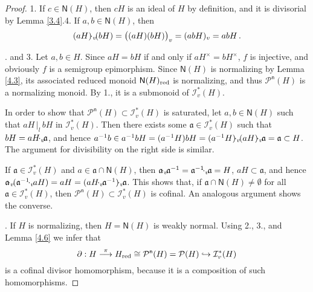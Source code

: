 \documentclass[a4paper]{amsart}
\theoremstyle{definition}
\numberwithin{equation}{section}
\begin{document}
\begin{proof}
1. If $c \in \mathsf N (H)$, then $cH$ is an ideal of $H$ by
definition, and it is divisorial by Lemma \ref{3.4}.4. If $a, b \in
\mathsf N (H)$, then
\[
(aH) {\negthinspace \cdot_v \negthinspace} (bH) = \big( (aH)(bH) \big)_v = (abH)_v = abH \,.
\]

. and 3. Let $a, b \in H$. Since $aH = bH$ if and only if
$aH^{\times} = bH^{\times}$, $f$ is injective, and obviously $f$ is
a semigroup epimorphism. Since $\mathsf N (H)$ is normalizing by
Lemma \ref{4.3}, its associated reduced monoid $\mathsf N
(H)_{{\text{\rm red}}}$ is normalizing, and thus $\mathcal P^{\mathsf n} (H)$ is
a normalizing monoid. By 1., it is a submonoid of $\mathcal I_v^*
(H)$.

In order to show that $\mathcal P^{\mathsf n} (H) \subset \mathcal
I_v^* (H)$ is saturated, let $a, b \in \mathsf N (H)$ such that $aH
{\, |_l \,} bH$ in $\mathcal I_v^* (H)$. Then there exists some $\mathfrak a
\in \mathcal I_v^* (H)$ such that $bH = aH {\negthinspace \cdot_v \negthinspace} \mathfrak a$, and hence $a^{-1}b \in a^{-1}bH = (a^{-1}H)bH = (a^{-1}H) {\negthinspace \cdot_v \negthinspace} (aH) {\negthinspace \cdot_v \negthinspace} \mathfrak a = \mathfrak a \subset H$. The argument for divisibility on the right side is similar.

If $\mathfrak a \in \mathcal I_v^* (H)$ and $a \in \mathfrak a \cap
\mathsf N (H)$, then $\mathfrak a {\negthinspace \cdot_v \negthinspace} \mathfrak a^{-1} = \mathfrak a^{-1} {\negthinspace \cdot_v \negthinspace} \mathfrak a = H$, $aH \subset \mathfrak a$, and hence $\mathfrak a
{\negthinspace \cdot_v \negthinspace} ( \mathfrak a^{-1} {\negthinspace \cdot_v \negthinspace} aH) = aH = ( aH {\negthinspace \cdot_v \negthinspace} \mathfrak a^{-1} ) {\negthinspace \cdot_v \negthinspace} \mathfrak a$. This shows that, if $\mathfrak
a \cap
      \mathsf N (H) \ne \emptyset$ for all $\mathfrak a \in \mathcal I_v^*
      (H)$, then $\mathcal P^{\mathsf n} (H) \subset \mathcal I_v^*
      (H)$ is cofinal. An analogous argument shows the converse.

. If $H$ is normalizing, then $H = \mathsf N (H)$ is weakly normal.
Using 2., 3., and  Lemma \ref{4.6} we infer that
\[
\partial: H \overset{\pi}{\longrightarrow} H_{{\text{\rm red}}} \cong \mathcal P^{\mathsf n} (H) = \mathcal P
(H) \hookrightarrow \mathcal I_v^* (H)
\]
is a  cofinal divisor homomorphism, because it is a composition of
such homomorphisms.
\end{proof}
\end{document}
